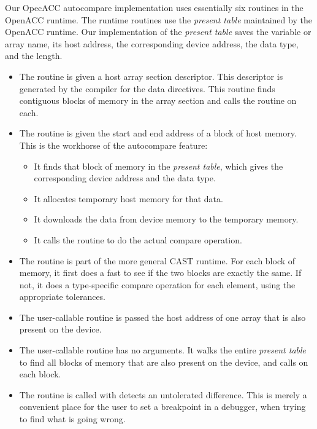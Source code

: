 Our OpecACC autocompare implementation uses essentially six routines in the OpenACC runtime.
The runtime routines use the \emph{present table}\cite{wolfe.ashes.17} maintained by the OpenACC runtime.
Our implementation of the \emph{present table} saves the variable or array name, its host address, the corresponding device address, the data type, and the length.
\begin{itemize}
\item The  routine is given a host array section descriptor.
This descriptor is generated by the compiler for the data directives.
This routine finds contiguous blocks of memory in the array section and calls the  routine on each.
\item The  routine is given the start and end address of a block of host memory.
This is the workhorse of the autocompare feature:
\begin{itemize}
\item It finds that block of memory in the \emph{present table}, which gives the corresponding device address and the data type.
\item It allocates temporary host memory for that data.
\item It downloads the data from device memory to the temporary memory.
\item It calls the  routine to do the actual compare operation.
\end{itemize}
\item The  routine is part of the more general CAST runtime.
For each block of memory, it first does a fast  to see if the two blocks are exactly the same.
If not, it does a type-specific compare operation for each element, using the appropriate tolerances.

\item The user-callable  routine is passed the host address of one array that is also present on the device.
\item The user-callable  routine has no arguments.
It walks the entire \emph{present table} to find all blocks of memory that are also present on the device, and calls  on each block.
\item The  routine is called with  detects an untolerated difference.
This is merely a convenient place for the user to set a breakpoint in a debugger, when trying to find what is going wrong.
\end{itemize}

